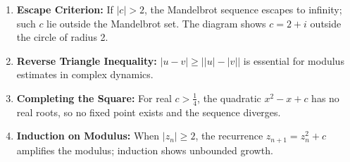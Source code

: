 \begin{takeaways}
\begin{enumerate}
    \item \textbf{Escape Criterion:} If $|c| > 2$, the Mandelbrot sequence escapes to infinity; such $c$ lie outside the Mandelbrot set. The diagram shows $c = 2 + i$ outside the circle of radius 2.
    \item \textbf{Reverse Triangle Inequality:} $|u - v| \ge \big| |u| - |v| \big|$ is essential for modulus estimates in complex dynamics.
    \item \textbf{Completing the Square:} For real $c > \tfrac{1}{4}$, the quadratic $x^2 - x + c$ has no real roots, so no fixed point exists and the sequence diverges.
    \item \textbf{Induction on Modulus:} When $|z_n| \ge 2$, the recurrence $z_{n+1} = z_n^2 + c$ amplifies the modulus; induction shows unbounded growth.
\end{enumerate}
\end{takeaways}
